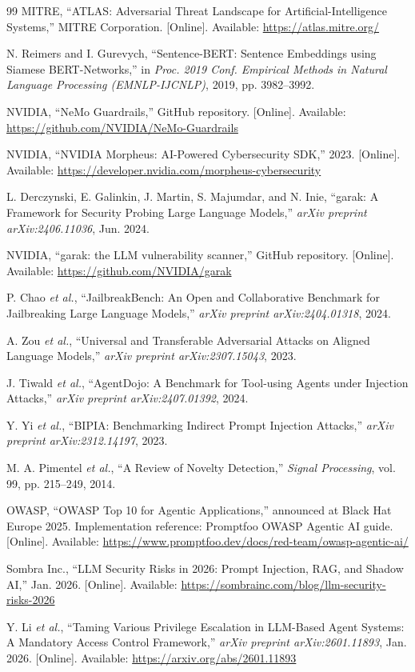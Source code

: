 \documentclass[journal]{IEEEtran}
\begin{document}
\begin{thebibliography}{99}
MITRE, ``ATLAS: Adversarial Threat Landscape for Artificial-Intelligence Systems,'' MITRE Corporation. [Online]. Available: \url{https://atlas.mitre.org/}

N. Reimers and I. Gurevych, ``Sentence-BERT: Sentence Embeddings using Siamese BERT-Networks,'' in \textit{Proc. 2019 Conf. Empirical Methods in Natural Language Processing (EMNLP-IJCNLP)}, 2019, pp. 3982--3992.

NVIDIA, ``NeMo Guardrails,'' GitHub repository. [Online]. Available: \url{https://github.com/NVIDIA/NeMo-Guardrails}

NVIDIA, ``NVIDIA Morpheus: AI-Powered Cybersecurity SDK,'' 2023. [Online]. Available: \url{https://developer.nvidia.com/morpheus-cybersecurity}

L. Derczynski, E. Galinkin, J. Martin, S. Majumdar, and N. Inie, ``garak: A Framework for Security Probing Large Language Models,'' \textit{arXiv preprint arXiv:2406.11036}, Jun. 2024.

NVIDIA, ``garak: the LLM vulnerability scanner,'' GitHub repository. [Online]. Available: \url{https://github.com/NVIDIA/garak}

P. Chao \textit{et al.}, ``JailbreakBench: An Open and Collaborative Benchmark for Jailbreaking Large Language Models,'' \textit{arXiv preprint arXiv:2404.01318}, 2024.

A. Zou \textit{et al.}, ``Universal and Transferable Adversarial Attacks on Aligned Language Models,'' \textit{arXiv preprint arXiv:2307.15043}, 2023.

J. Tiwald \textit{et al.}, ``AgentDojo: A Benchmark for Tool-using Agents under Injection Attacks,'' \textit{arXiv preprint arXiv:2407.01392}, 2024.

Y. Yi \textit{et al.}, ``BIPIA: Benchmarking Indirect Prompt Injection Attacks,'' \textit{arXiv preprint arXiv:2312.14197}, 2023.

M. A. Pimentel \textit{et al.}, ``A Review of Novelty Detection,'' \textit{Signal Processing}, vol. 99, pp. 215--249, 2014.

OWASP, ``OWASP Top 10 for Agentic Applications,'' announced at Black Hat Europe 2025. Implementation reference: Promptfoo OWASP Agentic AI guide. [Online]. Available: \url{https://www.promptfoo.dev/docs/red-team/owasp-agentic-ai/}

Sombra Inc., ``LLM Security Risks in 2026: Prompt Injection, RAG, and Shadow AI,'' Jan. 2026. [Online]. Available: \url{https://sombrainc.com/blog/llm-security-risks-2026}

Y. Li \textit{et al.}, ``Taming Various Privilege Escalation in LLM-Based Agent Systems: A Mandatory Access Control Framework,'' \textit{arXiv preprint arXiv:2601.11893}, Jan. 2026. [Online]. Available: \url{https://arxiv.org/abs/2601.11893}

\end{thebibliography}


\end{document}
